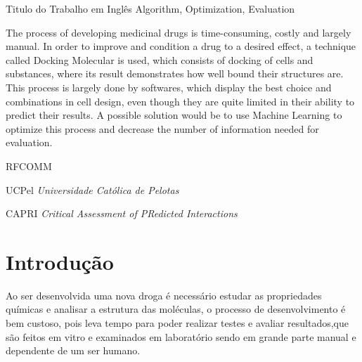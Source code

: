 \documentclass[tcc, capa]{texucpel}
\begin{document}
\begin{abstract}
O processo de desenvolvimento de drogas medicinais é demorado,custoso e em grande parte manual.
Para melhorar e condicionar uma droga a um efeito desejado, utiliza-se uma técnica chamada Docking Molecular, que consiste em realizar atracamento de células e substâncias,onde o seu resultado demonstra o quão bem ligadas suas estruturas estão.Este processo é feito em grande parte por softwares, que exibem a melhor opção e combinações no design das células, ainda que estejam bem limitados em sua capacidade de predizer seus resultados.Uma possível solução seria utilizar aprendizado de máquina para otimizar este processo e diminuir o número de informações necessárias passadas para avaliação.
\end{abstract}

\begin{englishabstract}
  {Titulo do Trabalho em Inglês}
  {Algorithm, Optimization, Evaluation}  
  
The process of developing medicinal drugs is time-consuming, costly and largely manual.
In order to improve and condition a drug to a desired effect, a technique called Docking Molecular is used, which consists of docking of cells and substances, where its result demonstrates how well bound their structures are. \\
This process is largely done by softwares, which display the best choice and combinations in cell design, even though they are quite limited in their ability to predict their results.
A possible solution would be to use Machine Learning to optimize this process and decrease the number of information needed for evaluation.

\end{englishabstract}

\listoffigures

\listoftables

\begin{listofabbrv}{RFCOMM}
		\item[UCPel] \textit{Universidade Cat\'olica de Pelotas}
        \item[CAPRI] \textit{Critical Assessment of PRedicted Interactions}

        
        
\end{listofabbrv}

\tableofcontents

\chapter{Introdução}
Ao ser desenvolvida uma nova droga é necessário estudar as propriedades químicas e analisar a estrutura das moléculas, o processo de desenvolvimento é bem custoso, pois leva tempo para poder realizar testes e avaliar resultados,que são feitos em vitro e examinados em laboratório sendo em grande parte manual e dependente de um ser humano.%
\end{document}
